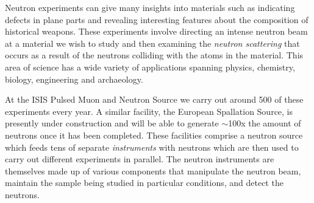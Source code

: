 Neutron experiments can give many insights into materials such as indicating defects in plane parts and revealing interesting features about the composition of historical weapons. These experiments involve directing an intense neutron beam at a material we wish to study and then examining the \textit{neutron scattering} that occurs as a result of the neutrons colliding with the atoms in the material. This area of science has a wide variety of applications spanning physics, chemistry, biology, engineering and archaeology.

At the ISIS Pulsed Muon and Neutron Source we carry out around 500 of these experiments every year. A similar facility, the European Spallation Source, is presently under construction and will be able to generate $\sim$100x the amount of neutrons once it has been completed. These facilities comprise a neutron source which feeds tens of separate \textit{instruments} with neutrons which are then used to carry out different experiments in parallel. The neutron instruments are themselves made up of various components that manipulate the neutron beam, maintain the sample being studied in particular conditions, and detect the neutrons.
